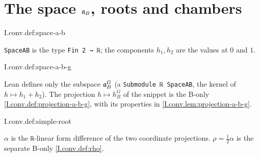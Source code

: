 \section{\texorpdfstring{The space $\mathfrak{a}_B$, roots and chambers}{The space 𝔞B, roots and chambers}}

\begin{definition}
\end{definition}
\begin{tfformal}{I.conv.def:space-a-b}
\begin{tffidelity}
\texttt{SpaceAB} is the type \texttt{Fin 2 → ℝ}; the components $h_1,h_2$ are the values at $0$ and $1$.
\end{tffidelity}
\end{tfformal}

\begin{definition}
\end{definition}
\begin{tfformal}{I.conv.def:space-a-b-g}
\begin{tffidelity}
Lean defines only the subspace $\mathfrak{a}_B^G$ (a \texttt{Submodule ℝ SpaceAB}, the kernel of $h\mapsto h_1+h_2$). The projection $h\mapsto h_B^G$ of the snippet is the B-only \cref{I.conv.def:projection-a-b-g}, with its properties in \cref{I.conv.lem:projection-a-b-g}.
\end{tffidelity}
\end{tfformal}

\begin{definition}
\end{definition}
\begin{tfformal}{I.conv.def:simple-root}
\begin{tffidelity}
$\alpha$ is the \texttt{ℝ}-linear form difference of the two coordinate projections. $\rho=\frac12\alpha$ is the separate B-only \cref{I.conv.def:rho}.
\end{tffidelity}
\end{tfformal}

